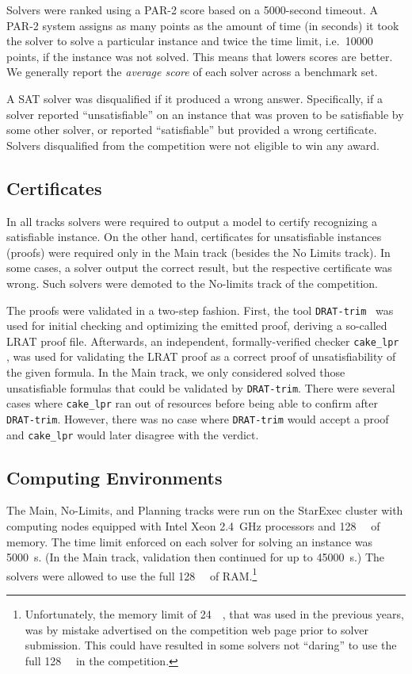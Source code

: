 \documentclass{elsarticle}
\begin{document}
Solvers were ranked using a PAR-2 score based on a \num{5000}-second timeout.
A PAR-2 system assigns as many points as the amount of time (in seconds) it took the solver
to solve a particular instance and twice the time limit, i.e.~\num{10000} points,
if the instance was not solved. This means that lowers scores are better.
We generally report the \emph{average score} of each solver across a benchmark set.

A SAT solver was disqualified if it produced a wrong answer. 
Specifically, if a solver reported ``unsatisfiable'' on an instance that 
was proven to be satisfiable by some other solver, or reported ``satisfiable'' 
but provided a wrong certificate. Solvers disqualified from the competition were
not eligible to win any award. 

\subsection{Certificates}

\label{sec:certif}

In all tracks solvers were required to output a model to certify recognizing a satisfiable instance.
On the other hand, 
certificates for unsatisfiable instances (proofs) were required only 
in the Main track (besides the No Limits track).
In some cases, a solver output the correct result, but the respective certificate was wrong. 
Such solvers were demoted to the No-limits track of the competition. 

The proofs were validated in a two-step fashion. First, the tool {\tt DRAT-trim}~\cite{DRATtrim}
was used for initial checking and optimizing the emitted proof, deriving a so-called LRAT proof file.
Afterwards, an independent, formally-verified checker {\tt cake\_lpr} \cite{cakeLprGithub}, 
was used for validating the LRAT proof as a correct proof of unsatisfiability of the given formula.
In the Main track, we only considered solved those unsatisfiable formulas that 
could be validated by {\tt DRAT-trim}.
There were several cases where {\tt cake\_lpr} ran out of resources before being able to 
confirm after {\tt DRAT-trim}. However, there was no case where {\tt DRAT-trim} would accept
a proof and {\tt cake\_lpr} would later disagree with the verdict.


\subsection{Computing Environments}

\label{sec:computing}
The Main, No-Limits, and Planning tracks were run on the StarExec cluster \cite{starexec}
with computing nodes  equipped with Intel Xeon \SI{2.4}{\giga\hertz} processors 
and \SI{128}{\giga\byte} of memory.
The time limit enforced on each solver for solving an instance was \SI{5000}{\second}. 
(In the Main track, validation then continued for up to \SI{45000}{\second}.)
The solvers were allowed to use the full \SI{128}{\giga\byte} of RAM.\footnote{
Unfortunately, the memory limit of \SI{24}{\giga\byte}, that was used in the previous years,
was by mistake advertised on the competition web page prior to solver submission.
This could have resulted in some solvers not ``daring'' to use the full \SI{128}{\giga\byte}
in the competition.}
\end{document}
